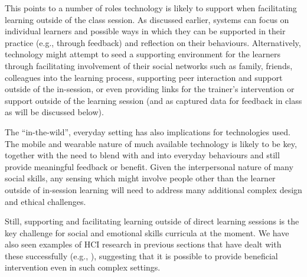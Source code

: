 \documentclass[prodmode,acmtochi]{acmsmall}
\newcommand{\todo}[1]{\textrm{\textrm{\textcolor{LightBlue}{[[#1]]} } } }
\begin{document}
This points to a number of roles technology is likely to support when facilitating learning outside of the class session. As discussed earlier, systems can focus on individual learners and possible ways in which they can be supported in their practice (e.g., through feedback) and reflection on their behaviours. Alternatively, technology might attempt to seed a supporting environment for the learners through facilitating involvement of their social networks such as family, friends, colleagues into the learning process, supporting peer interaction and support outside of the in-session, or even providing links for the trainer's intervention or support outside of the learning session (and as captured data for feedback in class as will be discussed below). 

The ``in-the-wild'', everyday setting has also implications for technologies used. The mobile and wearable nature of much available technology is likely to be key, together with the need to blend with and into everyday behaviours %
and still provide meaningful feedback or benefit. Given the interpersonal nature of many social skills, any sensing which might involve people other than the learner outside of in-session learning will need to address many additional complex design and ethical challenges. 

Still, supporting and facilitating learning outside of direct learning sessions is the key challenge for social and emotional skills curricula at the moment. We have also seen examples of HCI research in previous sections that have dealt with these successfully (e.g., \cite{Escobedo2012,Tentori2010,Matthews2011}), suggesting that it is possible to provide beneficial intervention even in such complex settings. 
\end{document}
